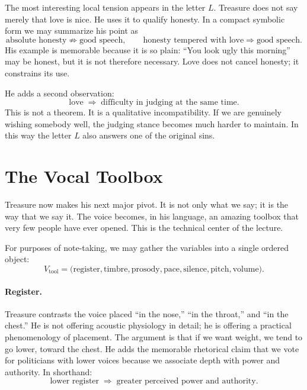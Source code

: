 The most interesting local tension appears in the letter \(L\). Treasure does not say merely that love is nice. He uses it to qualify honesty. In a compact symbolic form we may summarize his point as
\begin{equation}
\text{absolute honesty} \not\Rightarrow \text{good speech},
\qquad
\text{honesty tempered with love} \Rightarrow \text{good speech}.
\end{equation}
His example is memorable because it is so plain: ``You look ugly this morning'' may be honest, but it is not therefore necessary. Love does not cancel honesty; it constrains its use.

He adds a second observation:
\begin{equation}
\text{love} \;\Rightarrow\; \text{difficulty in judging at the same time}.
\end{equation}
This is not a theorem. It is a qualitative incompatibility. If we are genuinely wishing somebody well, the judging stance becomes much harder to maintain. In this way the letter \(L\) also answers one of the original sins.

\section{The Vocal Toolbox}

Treasure now makes his next major pivot. It is not only what we say; it is the way that we say it. The voice becomes, in his language, an amazing toolbox that very few people have ever opened. This is the technical center of the lecture.

For purposes of note-taking, we may gather the variables into a single ordered object:
\begin{equation}
V_{\text{tool}}=
\bigl(
\text{register},
\text{timbre},
\text{prosody},
\text{pace},
\text{silence},
\text{pitch},
\text{volume}
\bigr).
\end{equation}

\paragraph{Register.} Treasure contrasts the voice placed ``in the nose,'' ``in the throat,'' and ``in the chest.'' He is not offering acoustic physiology in detail; he is offering a practical phenomenology of placement. The argument is that if we want weight, we tend to go lower, toward the chest. He adds the memorable rhetorical claim that we vote for politicians with lower voices because we associate depth with power and authority. In shorthand:
\begin{equation}
\text{lower register} \;\Rightarrow\; \text{greater perceived power and authority}.
\end{equation}

